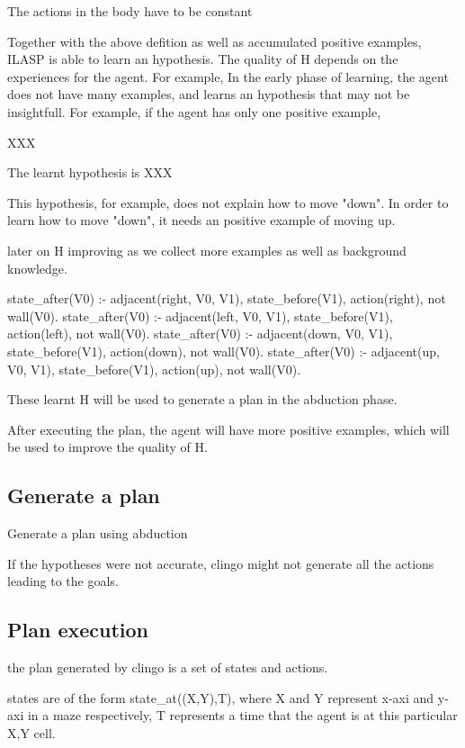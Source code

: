 The actions in the body have to be constant

Together with the above defition as well as accumulated positive examples, ILASP is able to learn an hypothesis. The quality of H depends on the experiences for the agent. 
For example, In the early phase of learning, the agent does not have many examples, and learns an hypothesis that may not be insightfull. 
For example, if the agent has only one positive example, 

XXX

The learnt hypothesis is XXX

This hypothesis, for example, does not explain how to move "down". In order to learn how to move "down", it needs an positive example of moving up. 

later on H improving as we collect more examples as well as background knowledge.

state\_after(V0) :- adjacent(right, V0, V1), state\_before(V1), action(right), not wall(V0).
state\_after(V0) :- adjacent(left, V0, V1), state\_before(V1), action(left), not wall(V0).
state\_after(V0) :- adjacent(down, V0, V1), state\_before(V1), action(down), not wall(V0).
state\_after(V0) :- adjacent(up, V0, V1), state\_before(V1), action(up), not wall(V0).

These learnt H will be used to generate a plan in the abduction phase. 

After executing the plan, the agent will have more positive examples, which will be used to improve the quality of H. 

\subsection{Generate a plan}
\label{Generate a plan}

Generate a plan using abduction

If the hypotheses were not accurate, clingo might not generate all the actions leading to the goals. 

\subsection{Plan execution}
\label{Plan execution}

the plan generated by clingo is a set of states and actions. 

states are of the form state\_at((X,Y),T), where X and Y represent x-axi and y-axi in a maze respectively, T represents a time that the agent is at 
this particular X,Y cell. 

